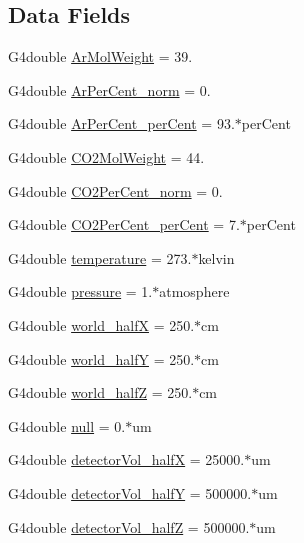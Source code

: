 \subsection*{Data Fields}
\begin{DoxyCompactItemize}
\item 
G4double \hyperlink{structUMConfig_a31dc39c8cb1cfdbaa648723dcd04a583}{Ar\+Mol\+Weight} = 39.
\item 
G4double \hyperlink{structUMConfig_aee77ef4ee8c82ef9749ba952a4956076}{Ar\+Per\+Cent\+\_\+norm} = 0.
\item 
G4double \hyperlink{structUMConfig_a0619ce16f7b8ea36806bfd25139c8a61}{Ar\+Per\+Cent\+\_\+per\+Cent} = 93.$\ast$per\+Cent
\item 
G4double \hyperlink{structUMConfig_ab4b67f65c87ddd62e28b0d49f407be31}{C\+O2\+Mol\+Weight} = 44.
\item 
G4double \hyperlink{structUMConfig_ad440ec0b6c4d101ea3828d8e2834d88a}{C\+O2\+Per\+Cent\+\_\+norm} = 0.
\item 
G4double \hyperlink{structUMConfig_a114afe6135ce3eabf5edb22efd2ef1ac}{C\+O2\+Per\+Cent\+\_\+per\+Cent} = 7.$\ast$per\+Cent
\item 
G4double \hyperlink{structUMConfig_ad7d3a7e160c3fe2781cee46f9be9d9fe}{temperature} = 273.$\ast$kelvin
\item 
G4double \hyperlink{structUMConfig_a2c2d0d2d44efd10c2e60e8814197f95e}{pressure} = 1.$\ast$atmosphere
\item 
G4double \hyperlink{structUMConfig_ac785a055563940563f77ff0bbef41d9d}{world\+\_\+half\+X} = 250.$\ast$cm
\item 
G4double \hyperlink{structUMConfig_af679f960918ff62d3cee8a9981ffdc2c}{world\+\_\+half\+Y} = 250.$\ast$cm
\item 
G4double \hyperlink{structUMConfig_a762a80fecef0cb5fbc95edf19275cfce}{world\+\_\+half\+Z} = 250.$\ast$cm
\item 
G4double \hyperlink{structUMConfig_ab3f35a95923333ff2eedff08309662ca}{null} = 0.$\ast$um
\item 
G4double \hyperlink{structUMConfig_aeb4e8d73f0c6f7e7993e7e5af94471b4}{detector\+Vol\+\_\+half\+X} = 25000.$\ast$um
\item 
G4double \hyperlink{structUMConfig_ad7c30cbfc9df06a290bcffe70f3d8b41}{detector\+Vol\+\_\+half\+Y} = 500000.$\ast$um
\item 
G4double \hyperlink{structUMConfig_ad9353827387f9222f0dbd881b0dd2746}{detector\+Vol\+\_\+half\+Z} = 500000.$\ast$um
\item 

\end{DoxyCompactItemize}
